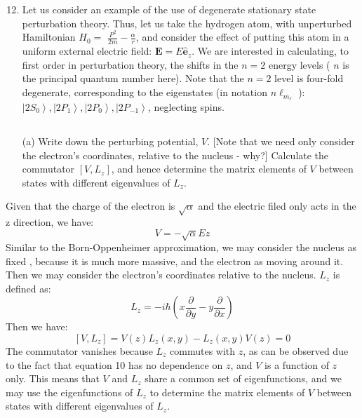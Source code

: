 \documentclass[12pt]{article}
\begin{document}
\section{}
\begin{enumerate}
  \setcounter{enumi}{11}
  \item Let us consider an example of the use of degenerate stationary state perturbation theory. Thus, let us take the hydrogen atom, with unperturbed Hamiltonian $H_{0}=$ $\frac{P^{2}}{2 m}-\frac{\alpha}{r}$, and consider the effect of putting this atom in a uniform external electric field: $\mathbf{E}=E \hat{\mathbf{e}}_{z}$. We are interested in calculating, to first order in perturbation theory, the shifts in the $n=2$ energy levels ( $n$ is the principal quantum number here). Note that the $n=2$ level is four-fold degenerate, corresponding to the eigenstates (in notation $n \ell_{m_{\ell}}$ ): $\left|2 S_{0}\right\rangle,\left|2 P_{1}\right\rangle,\left|2 P_{0}\right\rangle,\left|2 P_{-1}\right\rangle$, neglecting spins.
\subsection{}
(a) Write down the perturbing potential, $V$. [Note that we need only consider the electron's coordinates, relative to the nucleus - why?] Calculate the commutator $\left[V, L_{z}\right]$, and hence determine the matrix elements of $V$ between states with different eigenvalues of $L_{z}$.
\end{enumerate}
Given that the charge of the electron is $\sqrt{\alpha }$ and the electric filed only acts in the z direction, we have:
\begin{equation}
  V = -\sqrt{\alpha} E z
\end{equation}
Similar to the Born-Oppenheimer approximation, we may consider the nucleus as fixed , because it is much more massive, and the electron as moving around it. Then we may consider the electron's coordinates relative to the nucleus. $L_z$ is defined as:
\begin{equation}
  L_z = -i\hbar \left( x \frac{\partial}{\partial y} - y \frac{\partial}{\partial x} \right)
\end{equation}
Then we have:
\begin{equation}
  \left[V, L_{z}\right] = V(z)L_z(x,y) - L_z(x,y)V(z) = 0
\end{equation}
The commutator vanishes because $L_z$ commutes with $z$, as can be observed due to the fact that equation 10 has no dependence on $z$, and $V$ is a function of $z$ only. This means that $V$ and $L_z$ share a common set of eigenfunctions, and we may use the eigenfunctions of $L_z$ to determine the matrix elements of $V$ between states with different eigenvalues of $L_z$. \\
\end{document}

